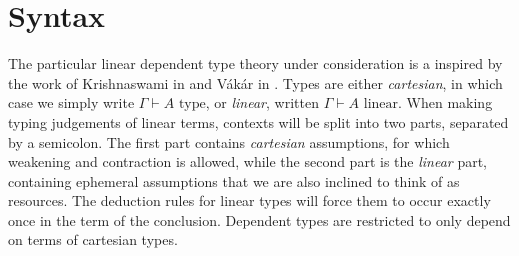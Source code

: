 \section{Syntax}
The particular linear dependent type theory under consideration is a inspired by the work of Krishnaswami in \cite{krishnaswami} and Vákár in \cite{vakar14}. Types are either \textit{cartesian}, in which case we simply write $\Gamma \vdash A \text{ type}$, or \textit{linear}, written $\Gamma \vdash A \text{ linear}$. When making typing judgements of linear terms, contexts will be split into two parts, separated by a semicolon. The first part contains \textit{cartesian} assumptions, for which weakening and contraction is allowed, while the second part is the \textit{linear} part, containing ephemeral assumptions that we are also inclined to think of as resources. The deduction rules for linear types will force them to occur exactly once in the term of the conclusion. Dependent types are restricted to only depend on terms of cartesian types. 
